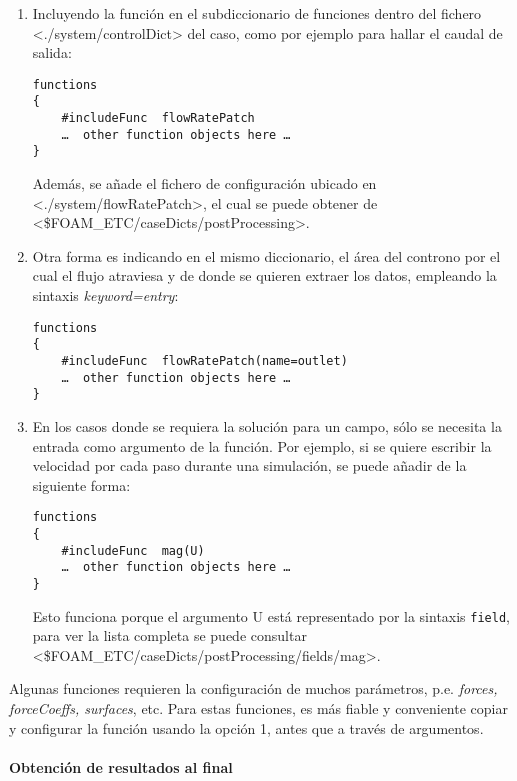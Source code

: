 \begin{enumerate}
\def\labelenumi{\arabic{enumi}.}
\item
  Incluyendo la función en el subdiccionario de funciones dentro del
  fichero \textless{}./system/controlDict\textgreater{} del caso, como
  por ejemplo para hallar el caudal de salida:

\begin{verbatim}
functions
{
    #includeFunc  flowRatePatch
    …  other function objects here …
}
\end{verbatim}

  Además, se añade el fichero de configuración ubicado en
  \textless{}./system/flowRatePatch\textgreater{}, el cual se puede
  obtener de
  \textless{}\$FOAM\_ETC/caseDicts/postProcessing\textgreater{}.
\item
  Otra forma es indicando en el mismo diccionario, el área del controno
  por el cual el flujo atraviesa y de donde se quieren extraer los
  datos, empleando la sintaxis \emph{keyword=entry}:

\begin{verbatim}
functions
{
    #includeFunc  flowRatePatch(name=outlet)
    …  other function objects here …
}
\end{verbatim}
\item
  En los casos donde se requiera la solución para un campo, sólo se
  necesita la entrada como argumento de la función. Por ejemplo, si se
  quiere escribir la velocidad por cada paso durante una simulación, se
  puede añadir de la siguiente forma:

\begin{verbatim}
functions
{
    #includeFunc  mag(U)
    …  other function objects here …
}
\end{verbatim}

  Esto funciona porque el argumento U está representado por la sintaxis
  \texttt{field}, para ver la lista completa se puede consultar
  \textless{}\$FOAM\_ETC/caseDicts/postProcessing/fields/mag\textgreater{}.
\end{enumerate}

Algunas funciones requieren la configuración de muchos parámetros, p.e.
\emph{forces, forceCoeffs, surfaces}, etc. Para estas funciones, es más
fiable y conveniente copiar y configurar la función usando la opción 1,
antes que a través de argumentos.

\paragraph{Obtención de resultados al final}\label{header-n419}

